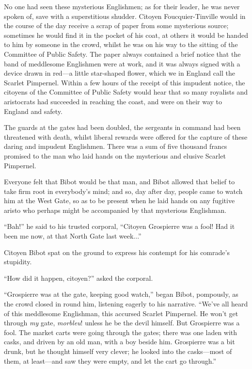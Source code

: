 No one had seen these mysterious Englishmen; as for their leader, he was never spoken of, save with a superstitious shudder. Citoyen Foucquier-Tinville would in the course of the day receive a scrap of paper from some mysterious source; sometimes he would find it in the pocket of his coat, at others it would be handed to him by someone in the crowd, whilst he was on his way to the sitting of the Committee of Public Safety. The paper always contained a brief notice that the band of meddlesome Englishmen were at work, and it was always signed with a device drawn in red---a little star-shaped flower, which we in England call the Scarlet Pimpernel. Within a few hours of the receipt of this impudent notice, the citoyens of the Committee of Public Safety would hear that so many royalists and aristocrats had succeeded in reaching the coast, and were on their way to England and safety.

The guards at the gates had been doubled, the sergeants in command had been threatened with death, whilst liberal rewards were offered for the capture of these daring and impudent Englishmen. There was a sum of five thousand francs promised to the man who laid hands on the mysterious and elusive Scarlet Pimpernel.

Everyone felt that Bibot would be that man, and Bibot allowed that belief to take firm root in everybody's mind; and so, day after day, people came to watch him at the West Gate, so as to be present when he laid hands on any fugitive aristo who perhaps might be accompanied by that mysterious Englishman.

\enquote{Bah!} he said to his trusted corporal, \enquote{Citoyen Grospierre was a fool! Had it been me now, at that North Gate last week...}

Citoyen Bibot spat on the ground to express his contempt for his comrade's stupidity.

\enquote{How did it happen, citoyen?} asked the corporal.

\enquote{Grospierre was at the gate, keeping good watch,} began Bibot, pompously, as the crowd closed in round him, listening eagerly to his narrative. \enquote{We've all heard of this meddlesome Englishman, this accursed Scarlet Pimpernel. He won't get through \textit{my} gate, \textit{morbleu}! unless he be the devil himself. But Grospierre was a fool. The market carts were going through the gates; there was one laden with casks, and driven by an old man, with a boy beside him. Grospierre was a bit drunk, but he thought himself very clever; he looked into the casks---most of them, at least---and saw they were empty, and let the cart go through.}

